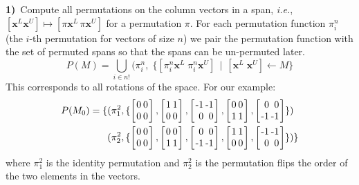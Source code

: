\documentclass[9pt,preprint]{sigplanconf}
\theoremstyle{definition}
\newcommand{\ie}{\emph{i.e.}}
\newcommand{\vect}[1]{\textbf{#1}}
\newcommand{\vtwo}[2]{\setlength{\arraycolsep}{0em}
\left[\begin{array}{l}#1\\#2\end{array}\right]}
\newcommand{\stwo}[4]
{\setlength{\arraycolsep}{0.1em}
\left[\begin{array}{rr}$#1$ & $#3$\\$#2$ & $#4$\end{array}\right]}
\begin{document}
\noindent
\textbf{1)\,} Compute all permutations on the column vectors in a span, \ie{},
  $[\vect{x}^L \vect{x}^U] \mapsto [\pi\vect{x}^L \, \pi\vect{x}^U]$
for a permutation $\pi$. For each permutation function $\pi^n_i$
(the $i$-th permutation for vectors of size $n$) we pair the
permutation function with the set of permuted spans so that
the spans can be un-permuted later.
%
\begin{equation*}
P(M) = \bigcup_{i \in n!} (\pi^n_{i} , \; \{[\pi^n_i
\vect{x}^L \; \pi^n_i\vect{x}^U] \, \mid \, [\vect{x}^L \; \vect{x}^U]
\leftarrow M\}
\end{equation*}
%
This corresponds to all rotations of the space.  For our example:
%
\begin{align*}
P(M_0) =
\{&(\pi^2_1, \{ \stwo{0}{0}{0}{0},
\stwo{1}{0}{1}{0},
\stwo{-1}{0}{-1}{0},
\stwo{0}{1}{0}{1},
\stwo{0}{-1}{0}{-1} \})
\\
&(\pi^2_2, \{
 \stwo{0}{0}{0}{0},
 \stwo{0}{1}{0}{1},
 \stwo{0}{-1}{0}{-1},
 \stwo{1}{0}{1}{0},
 \stwo{-1}{0}{-1}{0}\})\}
\end{align*}
%
where $\pi^2_1$ is the identity permutation and $\pi^2_2$ is the
permutation flips the order of the two elements in the 
vectors. \\[-1em]
\end{document}
